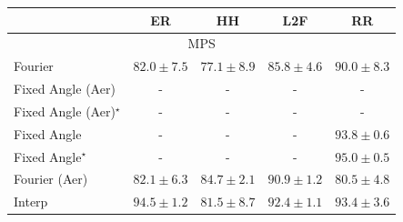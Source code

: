 \begin{tabular}{l|cccc|}
\toprule
            & ER & HH & L2F & RR \\
\midrule
\multicolumn{5}{c}{\rule{0pt}{8pt}MPS} \\
\midrule
Fourier & {\cellcolor[HTML]{F5841E}} \color[HTML]{F1F1F1} $82.0\pm 7.5$ & {\cellcolor[HTML]{FEB945}} \color[HTML]{000000} $77.1\pm 8.9$ & {\cellcolor[HTML]{DB5D0B}} \color[HTML]{F1F1F1} $85.8\pm 4.6$ & {\cellcolor[HTML]{AC3D03}} \color[HTML]{F1F1F1} $90.0\pm 8.3$ \\
Fixed Angle (Aer) & {\cellcolor[HTML]{000000}} \color[HTML]{F1F1F1} {\cellcolor{white}} \color{black} - & {\cellcolor[HTML]{000000}} \color[HTML]{F1F1F1} {\cellcolor{white}} \color{black} - & {\cellcolor[HTML]{000000}} \color[HTML]{F1F1F1} {\cellcolor{white}} \color{black} - & {\cellcolor[HTML]{000000}} \color[HTML]{F1F1F1} {\cellcolor{white}} \color{black} - \\
Fixed Angle (Aer)$^\star$ & {\cellcolor[HTML]{000000}} \color[HTML]{F1F1F1} {\cellcolor{white}} \color{black} - & {\cellcolor[HTML]{000000}} \color[HTML]{F1F1F1} {\cellcolor{white}} \color{black} - & {\cellcolor[HTML]{000000}} \color[HTML]{F1F1F1} {\cellcolor{white}} \color{black} - & {\cellcolor[HTML]{000000}} \color[HTML]{F1F1F1} {\cellcolor{white}} \color{black} - \\
Fixed Angle & {\cellcolor[HTML]{000000}} \color[HTML]{F1F1F1} {\cellcolor{white}} \color{black} - & {\cellcolor[HTML]{000000}} \color[HTML]{F1F1F1} {\cellcolor{white}} \color{black} - & {\cellcolor[HTML]{000000}} \color[HTML]{F1F1F1} {\cellcolor{white}} \color{black} - & {\cellcolor[HTML]{7B2B05}} \color[HTML]{F1F1F1} $93.8\pm 0.6$ \\
Fixed Angle$^\star$ & {\cellcolor[HTML]{000000}} \color[HTML]{F1F1F1} {\cellcolor{white}} \color{black} - & {\cellcolor[HTML]{000000}} \color[HTML]{F1F1F1} {\cellcolor{white}} \color{black} - & {\cellcolor[HTML]{000000}} \color[HTML]{F1F1F1} {\cellcolor{white}} \color{black} - & {\cellcolor[HTML]{6B2606}} \color[HTML]{F1F1F1} $95.0\pm 0.5$ \\
Fourier (Aer) & {\cellcolor[HTML]{F4821D}} \color[HTML]{F1F1F1} $82.1\pm 6.3$ & {\cellcolor[HTML]{E46710}} \color[HTML]{F1F1F1} $84.7\pm 2.1$ & {\cellcolor[HTML]{A13804}} \color[HTML]{F1F1F1} $90.9\pm 1.2$ & {\cellcolor[HTML]{FB9326}} \color[HTML]{000000} $80.5\pm 4.8$ \\
Interp & {\cellcolor[HTML]{712806}} \color[HTML]{F1F1F1} $94.5\pm 1.2$ & {\cellcolor[HTML]{F78921}} \color[HTML]{F1F1F1} $81.5\pm 8.7$ & {\cellcolor[HTML]{8C3004}} \color[HTML]{F1F1F1} $92.4\pm 1.1$ & {\cellcolor[HTML]{802D05}} \color[HTML]{F1F1F1} $93.4\pm 3.6$ \\

\end{tabular}
